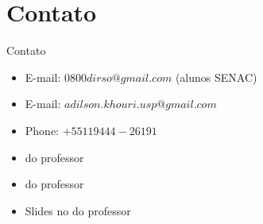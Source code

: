 \section*{Contato}

\begin{frame}	
	\begin{block}{Contato}	
		\begin{itemize}
			\item E-mail:  $0800dirso@gmail.com$ (alunos SENAC)			
			\item E-mail:  $adilson.khouri.usp@gmail.com$
			\item Phone: $+55 11 9444-26191$
			\item \href{https://www.linkedin.com/in/adilson-khouri/}{\color{blue}{Linkedin}} do professor
			\item \href{http://lattes.cnpq.br/2654721135214993}{\color{blue}{Lattes}} do professor
			\item Slides no \href{https://github.com/khouri/}{\color{blue}{GitHub}} do professor
		\end{itemize}
	\end{block}
\end{frame}

